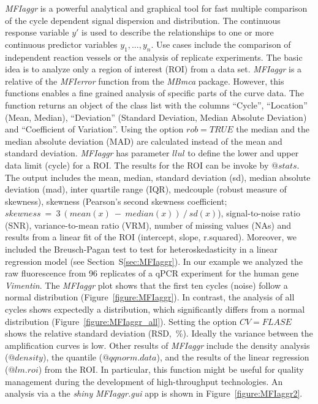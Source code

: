 \documentclass[twocolumn]{bmcart}%
\begin{document}
 \textsl{MFIaggr} is a powerful analytical and graphical tool for fast multiple 
comparison of the cycle dependent signal dispersion and distribution. The 
continuous response variable $y'$ is used to describe the relationships to one 
or more continuous predictor variables $y_1, ..., y_n$. Use cases include the 
comparison of independent reaction vessels or the analysis of replicate 
experiments. The basic idea is to analyze only a region of interest (ROI) from a 
data set. \textsl{MFIaggr} is a relative of the \textsl{MFIerror} function from 
the \emph{MBmca} package. However, this functions enables a fine grained 
analysis of specific parts of the curve data. The function returns an object of 
the class list with the columns ``Cycle'', ``Location'' (Mean, Median), 
``Deviation'' (Standard Deviation, Median Absolute Deviation) and ``Coefficient 
of Variation''. Using the option $rob = TRUE$ the median and the median absolute 
deviation (MAD) are calculated instead of the mean and standard deviation. 
\textsl{MFIaggr} has parameter $llul$ to define the lower and upper data limit 
(cycle) for a ROI. The results for the ROI can be invoke by $@stats$. The output 
includes the mean, median, standard deviation (sd), median absolute deviation 
(mad), inter quartile range (IQR), medcouple (robust measure of skewness), 
skewness (Pearson's second skewness coefficient; 
$skewness~=~3~(mean(x)~-~median(x))~/~sd(x)$), signal-to-noise ratio (SNR), 
variance-to-mean ratio (VRM), number of missing values (NAs) and results from a 
linear fit of the ROI (intercept, slope, r.squared). Moreover, we included 
the Breusch-Pagan test to test for heteroskedasticity in a linear regression 
model (see Section~S\ref{sec:MFIaggr}). In our example we analyzed the 
raw fluorescence from 96 replicates of a 
qPCR experiment for the human gene \textit{Vimentin}. The \textsl{MFIaggr} plot 
shows that the first ten cycles (noise) follow a normal distribution 
(Figure~\ref{figure:MFIaggr}). In contrast, the analysis of all cycles shows 
expectedly a distribution, which significantly differs from a normal 
distribution (Figure~\ref{figure:MFIaggr_all}). Setting the option $CV = FLASE$ 
shows the relative standard deviation (RSD,~\%). Ideally the variance between 
the amplification curves is low. Other results of 
\textsl{MFIaggr} include the density analysis ($@density$), the quantile 
($@qqnorm.data$), and the results of the linear regression ($@lm.roi$) from the 
ROI. In particular, this function might be useful for quality management during 
the development of high-throughput technologies. An analysis via a the 
\emph{shiny} \textsl{MFIaggr.gui} app is shown in Figure~\ref{figure:MFIaggr2}.
\end{document}
